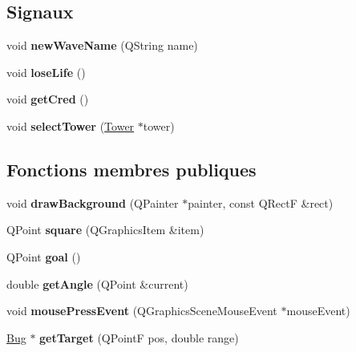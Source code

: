 \subsection*{Signaux}
\begin{DoxyCompactItemize}
\item 
\hypertarget{classRender_a916c15ab4b31cc0f34d9d53b89b89ac0}{
void {\bfseries newWaveName} (QString name)}
\label{classRender_a916c15ab4b31cc0f34d9d53b89b89ac0}

\item 
\hypertarget{classRender_ad88f7f01a7b9fafa756221707d590a78}{
void {\bfseries loseLife} ()}
\label{classRender_ad88f7f01a7b9fafa756221707d590a78}

\item 
\hypertarget{classRender_acd71f1c6c9d67dff3627da4ff6a4c9b8}{
void {\bfseries getCred} ()}
\label{classRender_acd71f1c6c9d67dff3627da4ff6a4c9b8}

\item 
\hypertarget{classRender_a126c4b49e93103a751f66359d8e63171}{
void {\bfseries selectTower} (\hyperlink{classTower}{Tower} $\ast$tower)}
\label{classRender_a126c4b49e93103a751f66359d8e63171}

\end{DoxyCompactItemize}
\subsection*{Fonctions membres publiques}
\begin{DoxyCompactItemize}
\item 
\hypertarget{classRender_aae10ca06c2755038752a2a007727f0ca}{
void {\bfseries drawBackground} (QPainter $\ast$painter, const QRectF \&rect)}
\label{classRender_aae10ca06c2755038752a2a007727f0ca}

\item 
\hypertarget{classRender_a1291eebbb0647502fc90d058bc22e7a3}{
QPoint {\bfseries square} (QGraphicsItem \&item)}
\label{classRender_a1291eebbb0647502fc90d058bc22e7a3}

\item 
\hypertarget{classRender_afd1f727c1514ca01ad1cefbf4992497b}{
QPoint {\bfseries goal} ()}
\label{classRender_afd1f727c1514ca01ad1cefbf4992497b}

\item 
\hypertarget{classRender_a696f385b556f15a7420293a055734e4d}{
double {\bfseries getAngle} (QPoint \&current)}
\label{classRender_a696f385b556f15a7420293a055734e4d}

\item 
\hypertarget{classRender_a899ce19de8a01bb4bc01653cd8761357}{
void {\bfseries mousePressEvent} (QGraphicsSceneMouseEvent $\ast$mouseEvent)}
\label{classRender_a899ce19de8a01bb4bc01653cd8761357}

\item 
\hypertarget{classRender_a3cb540a53c73c9febbee2e4b11ea1077}{
\hyperlink{classBug}{Bug} $\ast$ {\bfseries getTarget} (QPointF pos, double range)}
\label{classRender_a3cb540a53c73c9febbee2e4b11ea1077}

\end{DoxyCompactItemize}
